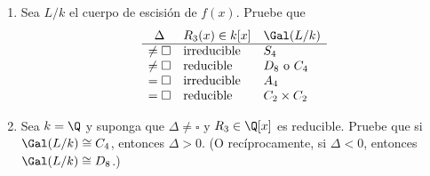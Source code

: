 \documentclass[11pt, reqno]{amsart}
\begin{document}
\begin{enumerate}
\begin{enumerate}
			\item Sea $L/k$ el cuerpo de escisión de $f(x)$.
				Pruebe que
				\[
					\begin{array}{cll}
						\Delta & R_3(x) \in k[x] & \Gal(L/k) \\
						\hline
						\ne\square & \text{irreducible} & S_4 \\
						\ne\square &   \text{reducible} & D_8 \text{ o } C_4 \\
						=  \square & \text{irreducible} & A_4 \\
						=  \square &   \text{reducible} & C_2\times C_2
					\end{array}
				\]

			\item Sea $k = \Q$ y suponga que $\Delta \ne \square$ y $R_3 \in \Q[x]$ es reducible.
				Pruebe que si $\Gal(L/k) \cong C_4$, entonces $\Delta > 0$.
				(O recíprocamente, si $\Delta < 0$, entonces $\Gal(L/k) \cong D_8$.)
		\end{enumerate}
		\nocite{conrad:cubic_quartic_nochar2}


\end{enumerate}
\end{document}
